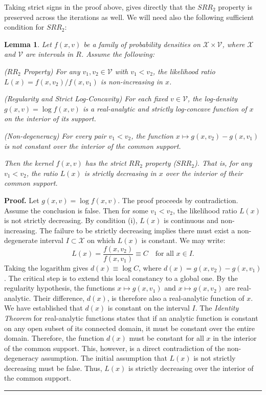 \documentclass[onecolumn]{article}
\newtheorem{lemma}[theorem]{Lemma}
\newenvironment{proof}[1][Proof]{\noindent\textbf{#1.} }{\ \rule{0.5em}{0.5em}}
\begin{document}
Taking strict signs in the proof above, gives directly that the $SRR_{2}$
property is preserved across the iterations as well. We will need also the
following sufficient condition for $SRR_{2}$:

\begin{lemma}
\label{aux-lem} Let $f(x,v)$ be a family of probability densities on $%
\mathcal{X}\times \mathcal{V}$, where $\mathcal{X}$ and $\mathcal{V}$ are
intervals in $R$. Assume the following:

($RR_{2}$ Property) For any $v_{1},v_{2}\in \mathcal{V}$ with $v_{1}<v_{2}$,
the likelihood ratio $L(x)=f(x,v_{2})/f(x,v_{1})$ is non-increasing in $x$.

(Regularity and Strict Log-Concavity) For each fixed $v\in \mathcal{V}$, the
log-density $g(x,v)=\log f(x,v)$ is a real-analytic and strictly log-concave
function of $x$ on the interior of its support.

(Non-degeneracy) For every pair $v_{1}<v_{2}$, the function $x\mapsto
g(x,v_{2})-g(x,v_{1})$ is not constant over the interior of the common
support.

Then the kernel $f(x,v)$ has the strict $RR_{2}$ property ($SRR_{2}$). That
is, for any $v_{1}<v_{2}$, the ratio $L(x)$ is strictly decreasing in $x$
over the interior of their common support.
\end{lemma}

\begin{proof}
Let $g(x,v)=\log f(x,v)$. The proof proceeds by contradiction. Assume the
conclusion is false. Then for some $v_{1}<v_{2}$, the likelihood ratio $L(x)$
is not strictly decreasing. By condition (i), $L(x)$ is continuous and
non-increasing. The failure to be strictly decreasing implies there must
exist a non-degenerate interval $I\subset \mathcal{X}$ on which $L(x)$ is
constant. We may write: 
\begin{equation}
L(x)=\frac{f(x,v_{2})}{f(x,v_{1})}\equiv C\quad \text{for all }x\in I.
\label{338}
\end{equation}%
Taking the logarithm gives $d(x)\equiv \log C$, where $%
d(x)=g(x,v_{2})-g(x,v_{1})$. The critical step is to extend this local
constancy to a global one. By the regularity hypothesis, the functions $%
x\mapsto g(x,v_{1})$ and $x\mapsto g(x,v_{2})$ are real-analytic. Their
difference, $d(x)$, is therefore also a real-analytic function of $x$. We
have established that $d(x)$ is constant on the interval $I$. The \textit{%
Identity Theorem} for real-analytic functions states that if an analytic
function is constant on any open subset of its connected domain, it must be
constant over the entire domain. Therefore, the function $d(x)$ must be
constant for all $x$ in the interior of the common support. This, however,
is a direct contradiction of the non-degeneracy assumption. The initial
assumption that $L(x)$ is not strictly decreasing must be false. Thus, $L(x)$
is strictly decreasing over the interior of the common support.
\end{proof}
\end{document}
